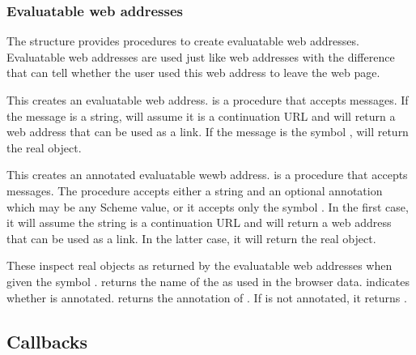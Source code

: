 \subsubsection{Evaluatable web addresses}

The  structure provides procedures to create
  evaluatable web addresses.  Evaluatable web addresses are used just
  like web addresses with the difference that  can
  tell whether the user used this web address to leave the web page.

\begin{desc}
  This creates an evaluatable web address.   is
  a procedure that accepts messages.  If the message is a string,
   will assume it is a continuation URL and
  will return a web address that can be used as a link.  If the
  message is the symbol ,  will
  return the real  object.
\end{desc}

\begin{desc}
  This creates an annotated evaluatable wewb address.
   is a procedure that accepts messages.  The
  procedure accepts either a string and an optional annotation which
  may be any Scheme value, or it accepts only the symbol .
  In the first case, it will assume the string is a continuation URL
  and will return a web address that can be used as a link.  In the
  latter case, it will return the real  object.
\end{desc}


\begin{desc}
  These inspect real  objects as returned by the
  evaluatable web addresses when given the symbol .
   returns the name of the  as used in
  the browser data.   indicates whether
   is annotated.   returns the
  annotation of .  If  is not annotated, it
  returns \sharpf.
\end{desc}

\subsection{Callbacks}

